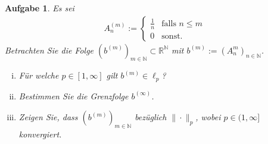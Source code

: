 \documentclass[a4paper, 20]{exam}
\newtheorem{ex}{Aufgabe}
\begin{document}
\begin{ex} Es sei 
\begin{align*}
A_n^{(m)}:= \begin{cases} \frac{1}{n} & \text{falls } n \leq m \\ 0 & \text{sonst}. \end{cases}
\end{align*}
Betrachten Sie die Folge $(b^{(m)})_{m \in \mathbb{N}} \subset \mathbb{R}^\mathbb{N}$ mit $b^{(m)}:= (A_n^m)_{n \in \mathbb{N}}$. 
\begin{enumerate}[i)]
\item Für welche $p \in [1, \infty]$ gilt $b^{(m)} \in \ell_p$?
\item Bestimmen Sie die Grenzfolge $b^{( \infty)}$.
\item Zeigen Sie, dass $(b^{(m)})_{m \in \mathbb{N}}$ bezüglich $\| \cdot \|_p$, wobei $p \in (1, \infty]$ konvergiert. 
\end{enumerate}
\end{ex}
\end{document}
